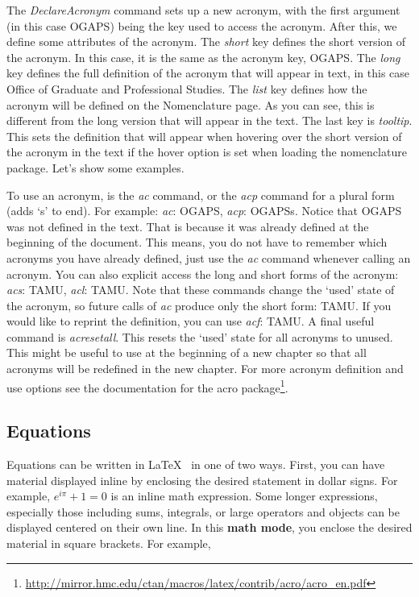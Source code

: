 The {\it DeclareAcronym} command sets up a new acronym, with the first argument (in this case OGAPS) being the key used to access the acronym. After this, we define some attributes of the acronym. The {\it short} key defines the short version of the acronym. In this case, it is the same as the acronym key, OGAPS. The {\it long} key defines the full definition of the acronym that will appear in text, in this case Office of Graduate and Professional Studies. The {\it list} key defines how the acronym will be defined on the Nomenclature page. As you can see, this is different from the long version that will appear in the text. The last key is {\it tooltip}. This sets the definition that will appear when hovering over the short version of the acronym in the text if the hover option is set when loading the nomenclature package. Let's show some examples.

To use an acronym, is the {\it ac} command, or the {\it acp} command for a plural form (adds `s' to end). For example: {\it ac}: \ac{OGAPS}, {\it acp}: \acp{OGAPS}. Notice that \ac{OGAPS} was not defined in the text. That is because it was already defined at the beginning of the document. This means, you do not have to remember which acronyms you have already defined, just use the {\it ac} command whenever calling an acronym. You can also explicit access the long and short forms of the acronym: {\it acs}: \acl{TAMU}, {\it acl}: \acs{TAMU}. Note that these commands change the `used' state of the acronym, so future calls of {\it ac} produce only the short form: \ac{TAMU}. If you would like to reprint the definition, you can use {\it acf}: \acf{TAMU}. A final useful command is {\it acresetall}. This resets the `used' state for all acronyms to unused. This might be useful to use at the beginning of a new chapter so that all acronyms will be redefined in the new chapter. For more acronym definition and use options see the documentation for the acro package\footnote{\url{http://mirror.hmc.edu/ctan/macros/latex/contrib/acro/acro_en.pdf}}.

\subsection{Equations}
Equations can be written in \LaTeX ~ in one of two ways. First, you can have material displayed inline by enclosing the desired statement in dollar signs. For example, $e^{i\pi}+1=0$ is an inline math expression. Some longer expressions, especially those including sums, integrals, or large operators and objects can be displayed centered on their own line. In this \textbf{math mode}, you enclose the desired material in square brackets. For example,

